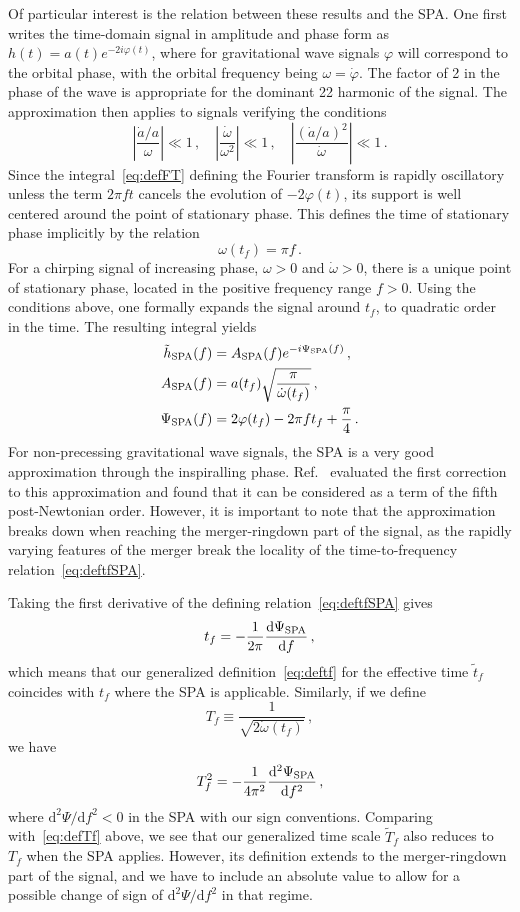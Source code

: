 \documentclass[aps,showpacs,%
prd,superscriptaddress,nofootinbib]{revtex4}
\newcommand{\be}{\begin{equation}}
\newcommand{\ee}{\end{equation}}
\newcommand\ud{{\mathrm{d}}}
\newcommand{\tf}{\tilde{t}_{f}}
\newcommand{\Tf}{\tilde{T}_{f}}
\begin{document}
Of particular interest is the relation between these results and the SPA. One first writes the time-domain signal in amplitude and phase form as $h(t) = a(t) e^{-2i\varphi(t)}$, where for gravitational wave signals $\varphi$ will correspond to the orbital phase, with the orbital frequency being $\omega = \dot{\varphi}$. The factor of 2 in the phase of the wave is appropriate for the dominant 22 harmonic of the signal. The approximation then applies to signals verifying the conditions
%
\be\label{eq:conditionSPA}
	\left| \frac{\dot{a}/a}{\omega} \right| \ll 1\,, \quad \left|\frac{\dot{\omega}}{\omega^{2}} \right| \ll 1\,, \quad \left| \frac{(\dot{a}/a)^{2}}{\dot{\omega}} \right| \ll 1 \,.
\ee
%
Since the integral~\eqref{eq:defFT} defining the Fourier transform is rapidly oscillatory unless the term $2\pi f t$ cancels the evolution of $-2\varphi(t)$, its support is well centered around the point of stationary phase. This defines the time of stationary phase implicitly by the relation
%
\be\label{eq:deftfSPA}
	\omega(t_{f}) = \pi  f \,.
\ee
% 
For a chirping signal of increasing phase, $\omega>0$ and $\dot{\omega}>0$, there is a unique point of stationary phase, located in the positive frequency range $f>0$. Using the conditions above, one formally expands the signal around $t_{f}$, to quadratic order in the time. The resulting integral yields
%
\begin{subequations}
\begin{align}
	\tilde{h}_{\rm SPA}(f) &= A_{\rm SPA}(f) e^{-i\Psi_{\rm SPA}(f)} \,, \\
	A_{\rm SPA}(f) &= a(t_{f}) \sqrt{\frac{\pi}{\dot{\omega}(t_{f})}} \,, \\
	\Psi_{\rm SPA}(f) &= 2\varphi(t_{f}) - 2\pi f t_{f} + \frac{\pi}{4} \,.
\end{align}
\end{subequations}
%
For non-precessing gravitational wave signals, the SPA is a very good approximation through the inspiralling phase. Ref.~\cite{} evaluated the first correction to this approximation and found that it can be considered as a term of the fifth post-Newtonian order. However, it is important to note that the approximation breaks down when reaching the merger-ringdown part of the signal, as the rapidly varying features of the merger break the locality of the time-to-frequency relation~\eqref{eq:deftfSPA}.  

Taking the first derivative of the defining relation~\eqref{eq:deftfSPA} gives
%
\be
	t_{f} = -\frac{1}{2\pi} \frac{\ud \Psi_{\rm SPA}}{\ud f} \,,
\ee
%
which means that our generalized definition~\eqref{eq:deftf} for the effective time $\tf$ coincides with $t_{f}$ where the SPA is applicable. Similarly, if we define
%
\be
	T_{f} \equiv \frac{1}{\sqrt{2\dot{\omega}(t_{f})}} \,,
\ee
%
we have
%
\be
	T_{f}^{2} = -\frac{1}{4\pi^{2}}  \frac{\ud^{2} \Psi_{\rm SPA}}{\ud f^{2}} \,,
\ee
%
where $\ud^{2}\Psi/\ud f^{2} < 0$ in the SPA with our sign conventions. Comparing with~\eqref{eq:defTf} above, we see that our generalized time scale $\Tf$ also reduces to $T_{f}$ when the SPA applies. However, its definition extends to the merger-ringdown part of the signal, and we have to include an absolute value to allow for a possible change of sign of $\ud^{2}\Psi/\ud f^{2}$ in that regime.
\end{document}
